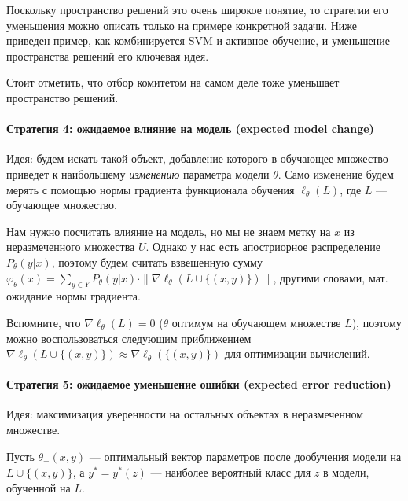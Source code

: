 \documentclass[]{article}
\let\oldparagraph\paragraph
\renewcommand{\paragraph}[1]{\oldparagraph{#1}\mbox{}}
\begin{document}
Поскольку пространство решений это очень широкое понятие, то стратегии
его уменьшения можно описать только на примере конкретной задачи. Ниже
приведен пример, как комбинируется SVM и активное обучение, и уменьшение
пространства решений его ключевая идея.

Стоит отметить, что отбор комитетом на самом деле тоже уменьшает
пространство решений.

\paragraph{Стратегия 4: ожидаемое влияние на модель (expected model
change)}\label{ux441ux442ux440ux430ux442ux435ux433ux438ux44f-4-ux43eux436ux438ux434ux430ux435ux43cux43eux435-ux432ux43bux438ux44fux43dux438ux435-ux43dux430-ux43cux43eux434ux435ux43bux44c-expected-model-change}

Идея: будем искать такой объект, добавление которого в обучающее
множество приведет к наибольшему \emph{изменению} параметра модели
\(\theta\). Само изменение будем мерять с помощью нормы градиента
функционала обучения \(\ell_{\theta}(L)\), где \(L\) --- обучающее
множество.

Нам нужно посчитать влияние на модель, но мы не знаем метку на \(x\) из
неразмеченного множества \(U\). Однако у нас есть апостриорное
распределение \(P_{\theta}(y|x)\), поэтому будем считать взвешенную
сумму
\(\varphi_{\theta}(x) = \sum_{y \in Y} P_{\theta}(y|x) \cdot \| \nabla\ell_{\theta}(L \cup \{(x, y)\})\|\),
другими словами, мат. ожидание нормы градиента.

Вспомните, что \(\nabla\ell_{\theta}(L) = 0\) (\(\theta\) оптимум на
обучающем множестве \(L\)), поэтому можно воспользоваться следующим
приближением
\(\nabla\ell_{\theta}(L \cup \{(x, y)\}) \approx \nabla\ell_{\theta}(\{(x, y)\})\)
для оптимизации вычислений.

\paragraph{Стратегия 5: ожидаемое уменьшение ошибки (expected error
reduction)}\label{ux441ux442ux440ux430ux442ux435ux433ux438ux44f-5-ux43eux436ux438ux434ux430ux435ux43cux43eux435-ux443ux43cux435ux43dux44cux448ux435ux43dux438ux435-ux43eux448ux438ux431ux43aux438-expected-error-reduction}

Идея: максимизация уверенности на остальных объектах в неразмеченном
множестве.

Пусть \(\theta_+(x, y)\) --- оптимальный вектор параметров после
дообучения модели на \(L \cup \{(x, y)\}\), а \(y^* = y^*(z)\) ---
наиболее вероятный класс для \(z\) в модели, обученной на \(L\).
\end{document}
